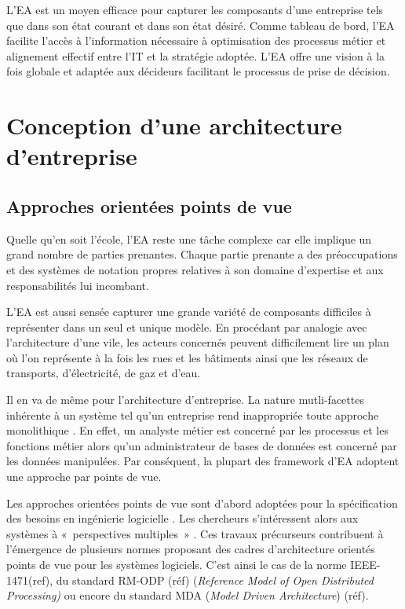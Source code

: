 L'EA est un moyen efficace pour capturer les composants d'une entreprise tels que dans son état courant et dans son état désiré. Comme tableau de bord, l'EA facilite l'accès à l'information nécessaire à optimisation des processus métier et alignement effectif entre l'IT et la stratégie adoptée. L'EA offre une vision à la fois globale et adaptée aux décideurs facilitant le processus de prise de décision. 

\section{Conception d'une architecture d'entreprise}

	\subsection{Approches orientées points de vue}

Quelle qu'en soit l'école, l'EA reste une tâche complexe \cite{steen2004supporting} car elle implique un grand nombre de parties prenantes. Chaque partie prenante a des préoccupations et des systèmes de notation propres relatives à son domaine d'expertise et aux responsabilités lui incombant.

L'EA est aussi sensée capturer une grande variété de composants difficiles à représenter dans un seul et unique modèle. 
En procédant par analogie avec l'architecture d'une vile, les acteurs concernés peuvent difficilement lire un plan où l'on représente à la fois les rues et les bâtiments ainsi que les réseaux de transports, d'électricité, de gaz et d'eau.  

Il en va de même pour l'architecture d'entreprise. La nature mutli-facettes inhérente à un système tel qu'un entreprise rend inappropriée toute approche monolithique \cite{armour1999bigpicture}. En effet, un analyste métier est concerné par les processus et les fonctions métier alors qu'un administrateur de bases de données est concerné par les données manipulées. Par conséquent, la plupart des 
framework d'EA adoptent une approche par points de vue.

Les approches orientées points de vue sont d'abord adoptées pour la 
spécification des besoins en ingénierie logicielle \cite{mullery1979core}. Les 
chercheurs s'intéressent alors aux systèmes à «~perspectives multiples~» 
\cite{finkelstein1992viewpoints} \cite{kotonya1996requirements} 
\cite{nuseibeh1994multi} \cite{meyers1993representing}. Ces travaux précurseurs contribuent à l'émergence de plusieurs normes proposant des cadres d'architecture orientés points de vue pour les systèmes logiciels. C'est ainsi le cas de la norme IEEE-1471(ref), du standard RM-ODP (réf) (\textit{Reference Model of Open Distributed Processing)} ou encore du standard MDA (\textit{Model Driven 
Architecture}) (réf).

